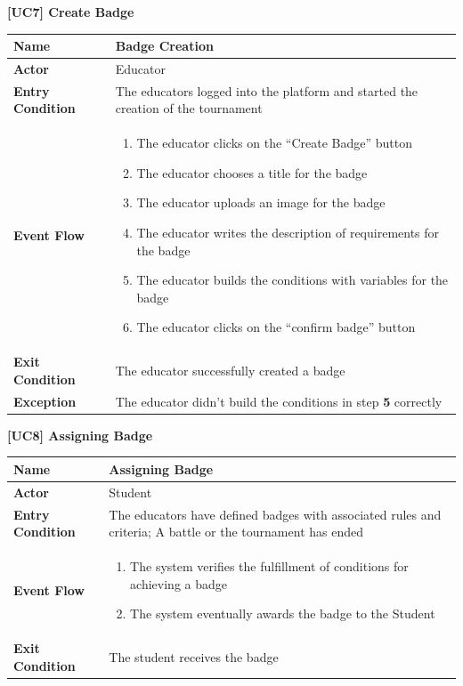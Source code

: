 \documentclass{article}
\begin{document}
\begin{table}
 \renewcommand{\arraystretch}{1.5}
    \centering
    \raggedright\textbf{[UC7] Create Badge}
    \begin{tabular}{|l|p{10cm}|}
        \hline
        \textbf{Name} & Badge Creation \\
        \hline
        \textbf{Actor} & Educator \\
        \hline
        \textbf{Entry Condition} & The educators logged into the platform and started the creation of the tournament  \\
        \hline
        \textbf{Event Flow} & 
        \begin{enumerate}[align=left, topsep=0pt, partopsep=0pt]
            \item The educator clicks on the “Create Badge” button
            \item The educator chooses a title for the badge
            \item The educator uploads an image for the badge
            \item The educator writes the description of requirements for the badge
            \item The educator builds the conditions with variables for the badge 
            \item The educator clicks on the “confirm badge” button
        \end{enumerate} \\
        \hline
        \textbf{Exit Condition} & The educator successfully created a badge \\
        \hline
        \textbf{Exception} & The educator didn't build the conditions in step \textbf{5} correctly  \\
        \hline
    \end{tabular}
\end{table}

\begin{table}
 \renewcommand{\arraystretch}{1.5}
    \centering
    \raggedright\textbf{[UC8] Assigning Badge}
    \begin{tabular}{|l|p{10cm}|}
        \hline
        \textbf{Name} & Assigning Badge \\
        \hline
        \textbf{Actor} & Student \\
        \hline
        \textbf{Entry Condition} & The educators have defined badges with associated rules and criteria; A battle or the tournament has ended\\
        \hline
        \textbf{Event Flow} & 
        \begin{enumerate}[align=left, topsep=0pt, partopsep=0pt]
            \item The system verifies the fulfillment of conditions for achieving a badge
            \item The system eventually awards the badge to the Student
        \end{enumerate} \\
        \hline
        \textbf{Exit Condition} & The student receives the badge \\
        \hline
    \end{tabular}
\end{table}
\end{document}
